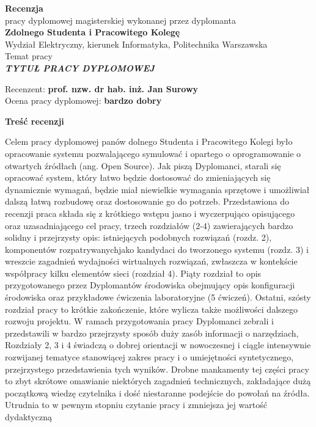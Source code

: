 \newpage
\begin{center}
 {\large\bf  Recenzja } \\
pracy dyplomowej magisterskiej wykonanej przez dyplomanta\\
{\bf Zdolnego Studenta i Pracowitego Kolegę} \\
 Wydział Elektryczny, kierunek Informatyka,  Politechnika Warszawska\\
Temat pracy\\
\textit{\bf
TYTUŁ PRACY DYPLOMOWEJ
}\\
\end{center}
\medskip
\noindent
Recenzent: {\bf prof. nzw. dr hab. inż. Jan Surowy}\\
Ocena pracy dyplomowej: {\bf bardzo dobry}
\medskip


\centerline{\bf Treść recenzji}
   Celem pracy dyplomowej panów dolnego Studenta i Pracowitego Kolegi  było
opracowanie systemu pozwalającego symulować  i opartego o oprogramowanie o
otwartych źródłach (ang. Open Source). Jak piszą Dyplomanci, starali się opracować
system, który łatwo będzie dostosować do zmieniających się dynamicznie wymagań,
będzie miał niewielkie wymagania sprzętowe i umożliwiał dalszą łatwą rozbudowę oraz
dostosowanie go do potrzeb.
Przedstawiona do recenzji praca składa się z krótkiego wstępu jasno i
wyczerpująco opisującego oraz uzasadniającego cel pracy, trzech rozdziałów (2-4)
zawierających bardzo solidny i przejrzysty opis: istniejących podobnych
rozwiązań (rozdz. 2), komponentów rozpatrywanychjako kandydaci do
tworzonego systemu (rozdz. 3) i wreszcie zagadnień wydajności wirtualnych
rozwiązań, zwłaszcza w kontekście współpracy  kilku elementów
 sieci (rozdział 4). Piąty rozdział to opis przygotowanego przez
Dyplomantów środowiska obejmujący opis konfiguracji
środowiska oraz przykładowe ćwiczenia laboratoryjne (5 ćwiczeń). Ostatni, szósty
rozdział pracy to krótkie zakończenie, które wylicza także możliwości dalszego
rozwoju projektu. W ramach przygotowania pracy Dyplomanci zebrali i przedstawili w
bardzo przejrzysty sposób duży zasób informacji o narzędziach, Rozdziały 2, 3 i 4 świadczą o dobrej orientacji
w nowoczesnej i ciągle intensywnie rozwijanej tematyce stanowiącej
zakres pracy i o umiejętności syntetycznego, przejrzystego przedstawienia tych
wyników. Drobne  mankamenty tej części pracy to zbyt skrótowe omawianie
niektórych zagadnień technicznych, zakładające dużą początkową wiedzę czytelnika
i dość niestaranne podejście do powołań na źródła.
Utrudnia to w pewnym stopniu czytanie pracy i zmniejsza jej wartość dydaktyczną
